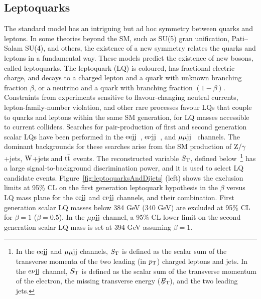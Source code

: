 \documentclass[11pt]{article}
\def\etmiss {\ensuremath{E_{\mathrm{T}}\hspace{-1.1em}/\kern0.5em}\xspace}
\def\pt{\ensuremath{p_{\rm T}}\xspace}
\def\eejj{$\rm{eejj}$\xspace}
\def\mumujj{$\mu\mu \rm{jj}$\xspace}
\def\enujj{$\rm{e}\nu \rm{jj}$\xspace}
\def\zjets{\ensuremath{\rm{Z}/\gamma}+jets\xspace}
\def\wjets{\ensuremath{\rm{W}}+jets\xspace}
\def\ttbar{\ensuremath{\rm{t} \bar{\rm{t}}}\xspace}
\def\ST{\ensuremath{S_{\rm T}}\xspace}
\begin{document}
\subsection{Leptoquarks}

The standard model has an intriguing but ad hoc symmetry between 
quarks and leptons. In some theories beyond the SM, such 
as SU(5) gran unification, Pati--Salam SU(4), and others, the existence of a new symmetry 
relates the quarks and leptons in a fundamental way. These models 
predict the existence of new bosons, called leptoquarks. 
The leptoquark (LQ) is coloured, has fractional electric charge, and 
decays to a charged lepton and a quark with unknown branching 
fraction $\beta$, or a neutrino and a quark with branching fraction 
$(1-\beta)$. Constraints from experiments sensitive to flavour-changing 
neutral currents, lepton-family-number violation, and other rare processes 
favour LQs that couple to quarks and leptons within the same SM generation, 
for LQ masses accessible to current colliders. 
Searches for pair-production of first and second 
generation scalar LQs have been performed in the \eejj~\cite{PhysRevLett.106.201802}, 
\enujj~\cite{PAPERenujj}, and \mumujj~\cite{PhysRevLett.106.201803} channels. 
The dominant backgrounds for these searches arise from the SM production of 
\zjets, \wjets and \ttbar events. The reconstructed variable \ST, defined 
below~\footnote{In the \eejj and \mumujj channels, 
\ST is defined as the scalar sum of the transverse momenta of the two 
leading (in \pt) charged leptons and jets. In the \enujj channel, 
\ST is defined as the scalar sum of the transverse momentum of the electron, 
the missing transverse energy (\etmiss), and the two leading jets.} 
has a large signal-to-background discrimination power, 
and it is used to select LQ candidate events.
Figure~\ref{fig:leptoquarksAndDijets} (left) shows the exclusion limits at 95\% CL on 
the first generation leptoquark hypothesis in the $\beta$ versus LQ mass 
plane for the \eejj and \enujj channels, and their combination. 
First generation scalar LQ masses below 384 GeV (340 GeV) are excluded 
at 95\% CL for $\beta=1$ ($\beta=0.5$). In the \mumujj channel, a 95\% CL lower limit on 
the second generation scalar LQ mass is set at 394 GeV assuming $\beta=1$.
\end{document}
